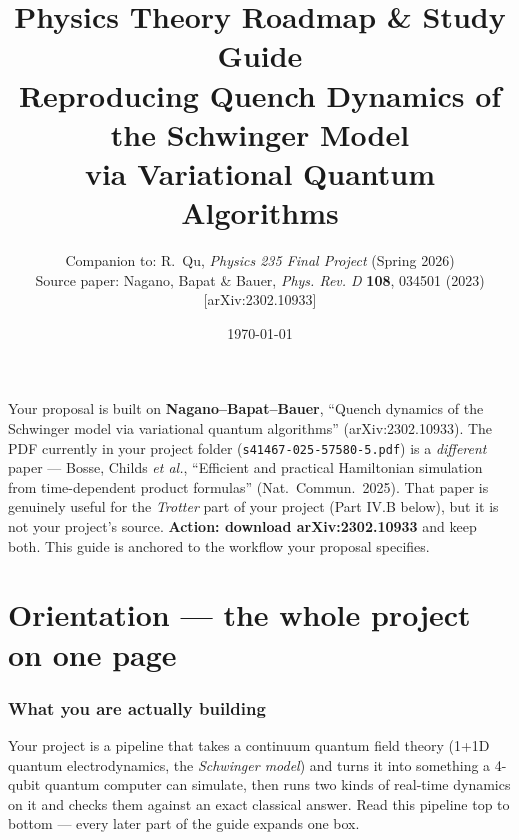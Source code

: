 \documentclass[11pt,a4paper]{article}
\title{\bfseries Physics Theory Roadmap \& Study Guide\\[4pt]
\large Reproducing Quench Dynamics of the Schwinger Model\\ via Variational Quantum Algorithms}
\author{Companion to: R.~Qu, \emph{Physics 235 Final Project} (Spring 2026)\\
Source paper: Nagano, Bapat \& Bauer, \emph{Phys. Rev. D} \textbf{108}, 034501 (2023) [arXiv:2302.10933]}
\date{\today}
\begin{document}
\maketitle

\begin{tcolorbox}[colback=red!5,colframe=red!60!black,title=\textbf{Before you start: a note on your source files}]
Your proposal is built on \textbf{Nagano--Bapat--Bauer}, ``Quench dynamics of the Schwinger model
via variational quantum algorithms'' (arXiv:2302.10933). The PDF currently in your project folder
(\texttt{s41467-025-57580-5.pdf}) is a \emph{different} paper --- Bosse, Childs \emph{et al.},
``Efficient and practical Hamiltonian simulation from time-dependent product formulas''
(Nat.\ Commun.\ 2025). That paper is genuinely useful for the \emph{Trotter} part of your project
(Part IV.B below), but it is not your project's source. \textbf{Action: download arXiv:2302.10933}
and keep both. This guide is anchored to the workflow your proposal specifies.
\end{tcolorbox}

\tableofcontents
\newpage

\part{Orientation --- the whole project on one page}

\section{What you are actually building}
Your project is a pipeline that takes a continuum quantum field theory (1+1D quantum
electrodynamics, the \emph{Schwinger model}) and turns it into something a 4-qubit quantum
computer can simulate, then runs two kinds of real-time dynamics on it and checks them against an
exact classical answer. Read this pipeline top to bottom --- every later part of the guide expands
one box.
\end{document}
